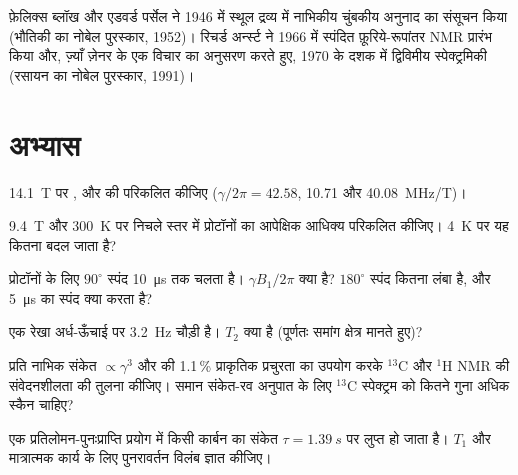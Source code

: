 \begin{history}[अनुनाद से दो विमाओं तक]
फ़ेलिक्स ब्लॉख और एडवर्ड पर्सेल ने 1946 में स्थूल द्रव्य में नाभिकीय चुंबकीय अनुनाद
का संसूचन किया (भौतिकी का नोबेल पुरस्कार, 1952)। रिचर्ड अर्न्स्ट ने 1966 में स्पंदित
फ़ूरिये-रूपांतर NMR प्रारंभ किया और, ज़्याँ ज़ेनर के एक विचार का अनुसरण करते हुए,
1970 के दशक में द्विविमीय स्पेक्ट्रमिकी (रसायन का नोबेल पुरस्कार, 1991)।
\end{history}

\section{अभ्यास}

\begin{exercise}[$\star$]\label{exo:b3:advanced-nmr:1}
\qty{14.1}{T} पर ,  और  की  परिकलित कीजिए
($\gamma/2\pi = 42.58$, 10.71 और \qty{40.08}{MHz/T})।
\end{exercise}

\begin{exercise}[$\star$]\label{exo:b3:advanced-nmr:2}
\qty{9.4}{T} और \qty{300}{K} पर निचले स्तर में प्रोटॉनों का आपेक्षिक आधिक्य परिकलित कीजिए।
\qty{4}{K} पर यह कितना बदल जाता है?
\end{exercise}

\begin{exercise}[$\star$]\label{exo:b3:advanced-nmr:3}
प्रोटॉनों के लिए $90^\circ$ स्पंद \qty{10}{\micro s} तक चलता है। $\gamma B_1/2\pi$ क्या है?
$180^\circ$ स्पंद कितना लंबा है, और \qty{5}{\micro s} का स्पंद क्या करता है?
\end{exercise}

\begin{exercise}[$\star$]\label{exo:b3:advanced-nmr:4}
एक रेखा अर्ध-ऊँचाई पर \qty{3.2}{Hz} चौड़ी है। $T_2$ क्या है (पूर्णतः
समांग क्षेत्र मानते हुए)?
\end{exercise}

\begin{exercise}[$\star\star$]\label{exo:b3:advanced-nmr:5}
प्रति नाभिक संकेत $\propto\gamma^3$ और  की 1.1\,\% प्राकृतिक प्रचुरता का
उपयोग करके ${}^{13}$C और ${}^1$H NMR की संवेदनशीलता की तुलना कीजिए। समान संकेत-रव अनुपात के लिए
${}^{13}$C स्पेक्ट्रम को कितने गुना अधिक स्कैन चाहिए?
\end{exercise}

\begin{exercise}[$\star\star$]\label{exo:b3:advanced-nmr:6}
एक प्रतिलोमन-पुनःप्राप्ति प्रयोग में किसी कार्बन का संकेत
$\tau = \qty{1.39}{s}$ पर लुप्त हो जाता है। $T_1$ और मात्रात्मक कार्य के लिए पुनरावर्तन विलंब ज्ञात कीजिए।
\end{exercise}

